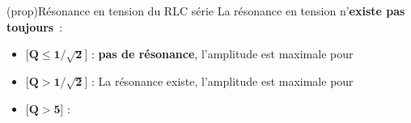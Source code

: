 \documentclass[../../main/main.tex]{subfiles}
\begin{document}
\begin{tcb*}[breakable](prop){Résonance en tension du RLC série}
	La résonance en tension n'\textbf{existe pas toujours}~:
	\begin{itemize}[leftmargin=60pt]
		\item{}[$\mathbf{Q \leq 1/\sqrt{2}}$] :
		      \textbf{pas de résonance}, l'amplitude est maximale pour
		      \psw{%
			      \[\boxed{x = 0 \qet U(0) = E_0}\]
		      }%
		      \vspace{-15pt}
		\item{}[$\mathbf{Q > 1/\sqrt{2}}$] :
		      La résonance existe, l'amplitude est maximale pour
		      \psw{%
			      \[
				      \boxed{x_r = \frac{1}{Q} \sqrt{Q^{2} - \frac{1}{2}} < 1}
				      \qet
				      \boxed{U(x_r) = \frac{QE}{\sqrt{1 - \frac{1}{4Q^{2}}}}}
			      \]
		      }%
		      \vspace{-15pt}
		\item{}[$\mathbf{Q > 5}$] :
		      \leavevmode\vspace*{-15pt}\relax
		      \vspace{-15pt}
	\end{itemize}
\end{tcb*}
\end{document}
